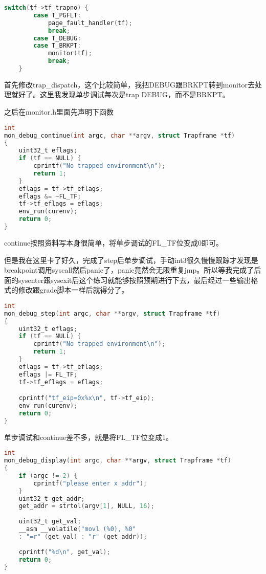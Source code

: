 \documentclass[11pt,a4paper]{article}
\begin{document}
\setmainfont{Consolas}
\begin{lstlisting}[language={C},firstnumber=1,title=kern/trap.c] 
switch(tf->tf_trapno) {
		case T_PGFLT:
			page_fault_handler(tf);
			break;
		case T_DEBUG:
		case T_BRKPT:
			monitor(tf);
			break;
	}
\end{lstlisting}
\setmainfont[BoldFont=黑体]{宋体}

首先修改trap\_dispatch，这个比较简单，我把DEBUG跟BRKPT转到monitor去处理就好了。这里我发现单步调试每次是trap DEBUG，而不是BRKPT。

之后在monitor.h里面先声明下函数

\setmainfont{Consolas}
\begin{lstlisting}[language={C},firstnumber=1,title=kern/monitor.c] 
int
mon_debug_continue(int argc, char **argv, struct Trapframe *tf)
{
	uint32_t eflags;
	if (tf == NULL) {
		cprintf("No trapped environment\n");
		return 1;
	}
	eflags = tf->tf_eflags;
	eflags &= ~FL_TF;
	tf->tf_eflags = eflags;
	env_run(curenv);
	return 0;
}
\end{lstlisting}
\setmainfont[BoldFont=黑体]{宋体}

continue按照资料写本身很简单，将单步调试的FL\_TF位变成0即可。

但是我在这里卡了好久，完成了step后单步调试，手动int3很久慢慢跟踪才发现是breakpoint调用syscall然后panic了，panic竟然会无限重复jmp。所以等我完成了后面的sysenter跟sysexit后这个练习就能够按照预期进行下去，最后经过一些输出格式的修改跟grade脚本一样后就得分了。

\setmainfont{Consolas}
\begin{lstlisting}[language={C},firstnumber=1,title=kern/monitor.c] 
int
mon_debug_step(int argc, char **argv, struct Trapframe *tf)
{
	uint32_t eflags;
	if (tf == NULL) {
		cprintf("No trapped environment\n");
		return 1;
	}
	eflags = tf->tf_eflags;
	eflags |= FL_TF;
	tf->tf_eflags = eflags;

	cprintf("tf_eip=0x%x\n", tf->tf_eip);
	env_run(curenv);
	return 0;
}
\end{lstlisting}
\setmainfont[BoldFont=黑体]{宋体}

单步调试和continue差不多，就是将FL\_TF位变成1。

\setmainfont{Consolas}
\begin{lstlisting}[language={C},firstnumber=1,title=kern/monitor.c] 
int
mon_debug_display(int argc, char **argv, struct Trapframe *tf)
{
	if (argc != 2) {
		cprintf("please enter x addr");
	}
	uint32_t get_addr;
	get_addr = strtol(argv[1], NULL, 16);
	
	uint32_t get_val;
    __asm __volatile("movl (%0), %0" 
    : "=r" (get_val) : "r" (get_addr)); 
	
	cprintf("%d\n", get_val);
	return 0;
}
\end{lstlisting}
\setmainfont[BoldFont=黑体]{宋体}
\end{document}
